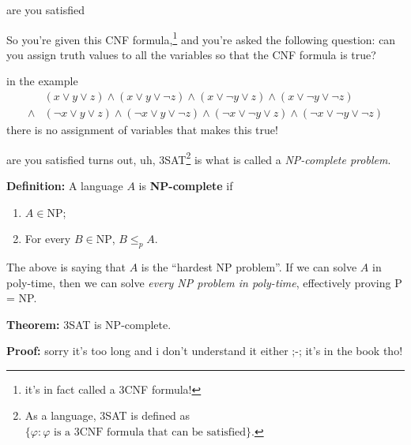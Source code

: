 \documentclass{beamer}
\begin{document}
\begin{frame}{are you satisfied \emojiflushed}

So you're given this CNF formula,\footnote{it's in fact called a 3CNF formula!} and you're asked the following question: can you assign truth values to all the variables so that the CNF formula is true? 

\vspace{2mm}

in the example \begin{align*}
&(x \lor y \lor z) \land (x \lor y \lor \neg z) \land (x \lor \neg y \lor z) \land  (x \lor \neg y \lor \neg z)\\
\land &(\neg x \lor y \lor z) \land (\neg x \lor y \lor \neg z) \land (\neg x \lor \neg y \lor z) \land (\neg x \lor \neg y \lor \neg z)
\end{align*}
there is no assignment of variables that makes this true!
\end{frame}

\begin{frame}{are you satisfied \emojiflushed}
turns out, uh, 3SAT\footnote{As a language, 3SAT is defined as $\{\varphi: \text{$\varphi$ is a 3CNF formula that can be satisfied}\}$.} is what is called a \textit{NP-complete problem}. 

\textbf{Definition:} A language $A$ is \textbf{NP-complete} if
\begin{enumerate}[label=(\alph*)]
\item $A \in \text{NP}$;
\item For every $B \in \text{NP}$, $B \leq_p A$.
\end{enumerate}
The above is saying that $A$ is the ``hardest NP problem''. If we can solve $A$ in poly-time, then we can solve \textit{every NP problem in poly-time}, effectively proving P = NP.

\vspace{2mm}

\textbf{Theorem:} 3SAT is NP-complete.

\textbf{Proof:} sorry it's too long and i don't understand it either ;-; it's in the book tho!
\end{frame}
\end{document}
